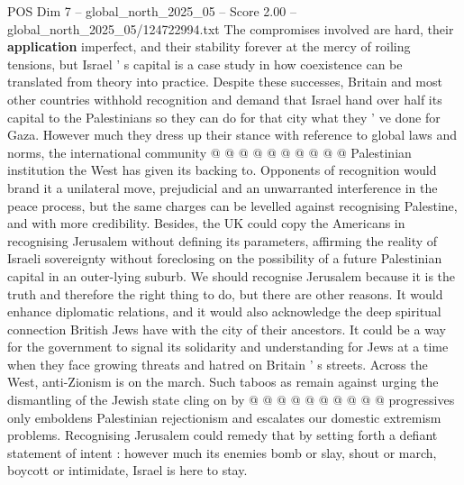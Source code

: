 \begin{textsample}{POS Dim 7 – global\_north\_2025\_05 – Score 2.00 – global\_north\_2025\_05/124722994.txt}
The compromises involved are hard, their \textbf{application} imperfect, and their stability forever at the mercy of roiling tensions, but Israel ' s capital is a case study in how coexistence can be translated from theory into practice.
Despite these successes, Britain and most other countries withhold recognition and demand that Israel hand over half its capital to the Palestinians so they can do for that city what they ' ve done for Gaza.
However much they dress up their stance with reference to global laws and norms, the international community @ @ @ @ @ @ @ @ @ @ Palestinian institution the West has given its backing to.
Opponents of recognition would brand it a unilateral move, prejudicial and an unwarranted interference in the peace process, but the same charges can be levelled against recognising Palestine, and with more credibility.
Besides, the UK could copy the Americans in recognising Jerusalem without defining its parameters, affirming the reality of Israeli sovereignty without foreclosing on the possibility of a future Palestinian capital in an outer-lying suburb.
We should recognise Jerusalem because it is the truth and therefore the right thing to do, but there are other reasons.
It would enhance diplomatic relations, and it would also acknowledge the deep spiritual connection British Jews have with the city of their ancestors.
It could be a way for the government to signal its solidarity and understanding for Jews at a time when they face growing threats and hatred on Britain ' s streets.
Across the West, anti-Zionism is on the march.
Such taboos as remain against urging the dismantling of the Jewish state cling on by @ @ @ @ @ @ @ @ @ @ progressives only emboldens Palestinian rejectionism and escalates our domestic extremism problems.
Recognising Jerusalem could remedy that by setting forth a defiant statement of intent : however much its enemies bomb or slay, shout or march, boycott or intimidate, Israel is here to stay.

\end{textsample}
